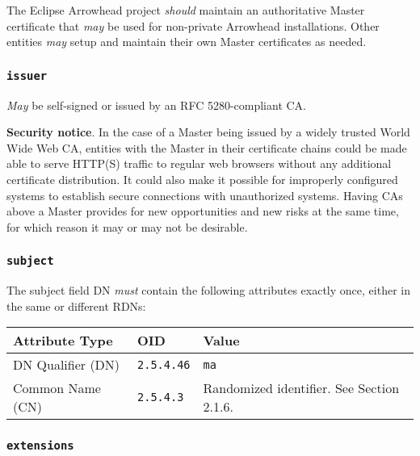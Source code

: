 The Eclipse Arrowhead project \textit{should} maintain an authoritative Master certificate that \textit{may} be used for non-private Arrowhead installations.
Other entities \textit{may} setup and maintain their own Master certificates as needed.

\subsubsection{\texttt{issuer}}

\textit{May} be self-signed or issued by an RFC 5280-compliant CA.

\textbf{Security notice}.
In the case of a Master being issued by a widely trusted World Wide Web CA, entities with the Master in their certificate chains could be made able to serve HTTP(S) traffic to regular web browsers without any additional certificate distribution.
It could also make it possible for improperly configured systems to establish secure connections with unauthorized systems.
Having CAs above a Master provides for new opportunities and new risks at the same time, for which reason it may or may not be desirable.

\subsubsection{\texttt{subject}}

The subject field DN \textit{must} contain the following attributes exactly once, either in the same or different RDNs:

\vspace*{0.5cm}
\noindent\begin{tabularx}{\textwidth}{| p{4cm} | p{2cm} | X |} \hline
\rowcolor{gray!33} Attribute Type & OID               & Value \\ \hline

DN Qualifier (DN)                 & \texttt{2.5.4.46} & \texttt{ma} \\ \hline
Common Name (CN)                  & \texttt{2.5.4.3}  &  Randomized identifier. See Section 2.1.6. \\ \hline

\end{tabularx}
\vspace*{0.5cm}


\subsubsection{\texttt{extensions}}

